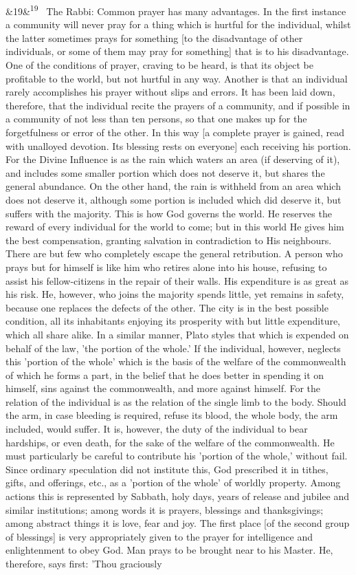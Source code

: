\documentclass[12pt]{article}
\newcommand{\para}[1][]{\par\noindent\ifx&#1&\else\textsuperscript{\footnotesize #1}~\fi}
\begin{document}
\para[19] The Rabbi: Common prayer has many advantages. In the first instance a community will never pray for a thing which is hurtful for the individual, whilst the latter sometimes prays for something [to the disadvantage of other individuals, or some of them may pray for something] that is to his disadvantage. One of the conditions of prayer, craving to be heard, is that its object be profitable to the world, but not hurtful in any way. Another is that an individual rarely accomplishes his prayer without slips and errors. It has been laid down, therefore, that the individual recite the prayers of a community, and if possible in a community of not less than ten persons, so that one makes up for the forgetfulness or error of the other. In this way [a complete prayer is gained, read with unalloyed devotion. Its blessing rests on everyone] each receiving his portion. For the Divine Influence is as the rain which waters an area (if deserving of it), and includes some smaller portion which does not deserve it, but shares the general abundance. On the other hand, the rain is withheld from an area which does not deserve it, although some portion is included which did deserve it, but suffers with the majority. This is how God governs the world. He reserves the reward of every individual for the world to come; but in this world He gives him the best compensation, granting salvation in contradiction to His neighbours. There are but few who completely escape the general retribution. A person who prays but for himself is like him who retires alone into his house, refusing to assist his fellow-citizens in the repair of their walls. His expenditure is as great as his risk. He, however, who joins the majority spends little, yet remains in safety, because one replaces the defects of the other. The city is in the best possible condition, all its inhabitants enjoying its prosperity with but little expenditure, which all share alike. In a similar manner, Plato styles that which is expended on behalf of the law, 'the portion of the whole.' If the individual, however, neglects this 'portion of the whole' which is the basis of the welfare of the commonwealth of which he forms a part, in the belief that he does better in spending it on himself, sins against the commonwealth, and more against himself. For the relation of the individual is as the relation of the single limb to the body. Should the arm, in case bleeding is required, refuse its blood, the whole body, the arm included, would suffer. It is, however, the duty of the individual to bear hardships, or even death, for the sake of the welfare of the commonwealth. He must particularly be careful to contribute his 'portion of the whole,' without fail. Since ordinary speculation did not institute this, God prescribed it in tithes, gifts, and offerings, etc., as a 'portion of the whole' of worldly property. Among actions this is represented by Sabbath, holy days, years of release and jubilee and similar institutions; among words it is prayers, blessings and thanksgivings; among abstract things it is love, fear and joy. The first place [of the second group of blessings] is very appropriately given to the prayer for intelligence and enlightenment to obey God. Man prays to be brought near to his Master. He, therefore, says first: 'Thou graciously 
\end{document}
